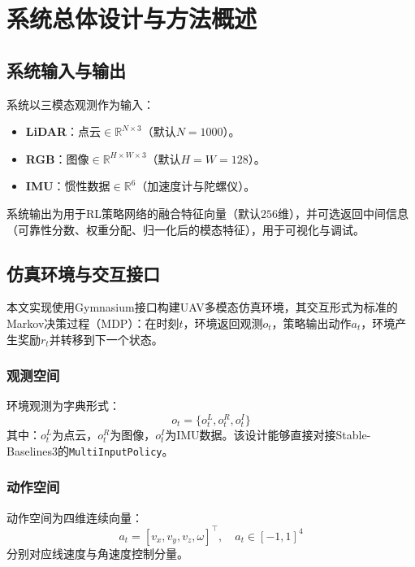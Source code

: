 \chapter{系统总体设计与方法概述}

\section{系统输入与输出}
系统以三模态观测作为输入：
\begin{itemize}
    \item \textbf{LiDAR}：点云$\in \mathbb{R}^{N\times 3}$（默认$N=1000$）。
    \item \textbf{RGB}：图像$\in \mathbb{R}^{H\times W\times 3}$（默认$H=W=128$）。
    \item \textbf{IMU}：惯性数据$\in \mathbb{R}^{6}$（加速度计与陀螺仪）。
\end{itemize}
系统输出为用于RL策略网络的融合特征向量（默认$256$维），并可选返回中间信息（可靠性分数、权重分配、归一化后的模态特征），用于可视化与调试。

\section{仿真环境与交互接口}
本文实现使用Gymnasium接口构建UAV多模态仿真环境，其交互形式为标准的Markov决策过程（MDP）：在时刻$t$，环境返回观测$o_t$，策略输出动作$a_t$，环境产生奖励$r_t$并转移到下一个状态。

\subsection{观测空间}
环境观测为字典形式：
\begin{equation}
o_t = \{o_t^{L}, o_t^{R}, o_t^{I}\}
\end{equation}
其中：$o_t^{L}$为点云，$o_t^{R}$为图像，$o_t^{I}$为IMU数据。该设计能够直接对接Stable-Baselines3的\texttt{MultiInputPolicy}。

\subsection{动作空间}
动作空间为四维连续向量：
\begin{equation}
a_t = [v_x, v_y, v_z, \omega]^\top, \quad a_t \in [-1, 1]^4
\end{equation}
分别对应线速度与角速度控制分量。

